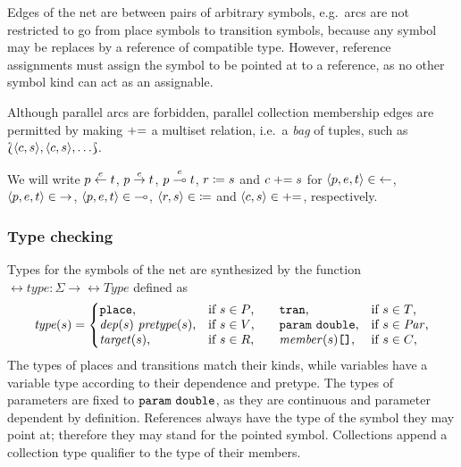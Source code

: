 Edges of the net are between pairs of arbitrary symbols, e.g.~arcs are not restricted to go from place symbols to transition symbols, because any symbol may be replaces by a reference of compatible type. However, reference assignments must assign the symbol to be pointed at to a reference, as no other symbol kind can act as an assignable.

Although parallel arcs are forbidden, parallel collection membership edges are permitted by making \({\mathrel{{+}{=}}}\) a multiset relation, i.e.~a \emph{bag} of tuples, such as \(\Lbag \langle c, s \rangle, \langle c, s \rangle, \ldots \Rbag\).

We will write \(p \overset{e}{\leftarrow} t\), \(p \overset{e}{\rightarrow} t\), \(p \overset{e}{\multimap} t\), \(r \coloneq s\) and \(c \mathrel{{+}{=}} s\) for \(\langle p, e, t \rangle \in {\leftarrow}\), \(\langle p, e, t \rangle \in {\rightarrow}\), \(\langle p, e, t \rangle \in {\multimap}\), \(\langle r, s \rangle \in {\coloneq}\) and \(\langle c, s \rangle \in {\mathrel{{+}{=}}}\), respectively.

\subsubsection{Type checking}

Types for the symbols of the net are synthesized by the function \(\rel{type}\colon \Sigma \to \rel{Type}\) defined as
\begin{equation}
  \rel{type}(s) = \left\{\begin{array}{@{}l@{\quad}l@{\qquad}l@{\quad}l@{}}
    \lit{place} \text, & \text{if \(s \in P\),}
    & \lit{tran} \text, & \text{if \(s \in T\),} \\
    \vartype{\rel{dep}(s)}{\rel{pretype}(s)} \text, & \text{if \(s \in V\),}
    & \vartype{\lit{param}}{\lit{double}} \text, & \text{if \(s \in \Par\),} \\
    \rel{target}(s) \text, & \text{if \(s \in R\),}
    & \bagtype{\rel{member}(s)} \text, & \text{if \(s \in C\),}
  \end{array}\right.
\end{equation}
The types of places and transitions match their kinds, while variables have a variable type according to their dependence and pretype. The types of parameters are fixed to \(\texttt{\upshape param}\ \texttt{\upshape double}\), as they are continuous and parameter dependent by definition. References always have the type of the symbol they may point at; therefore they may stand for the pointed symbol. Collections append a collection type qualifier to the type of their members.

